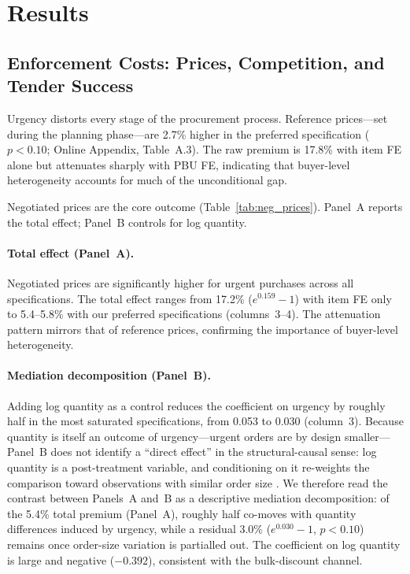 \section{Results}
\label{sec:results}

\subsection{Enforcement Costs: Prices, Competition, and Tender Success}
\label{sec:main_results}

Urgency distorts every stage of the procurement process. Reference prices---set during the planning phase---are 2.7\% higher in the preferred specification ($p < 0.10$; Online Appendix, Table~A.3). The raw premium is 17.8\% with item FE alone but attenuates sharply with PBU FE, indicating that buyer-level heterogeneity accounts for much of the unconditional gap.

Negotiated prices are the core outcome (Table~\ref{tab:neg_prices}). Panel~A reports the total effect; Panel~B controls for log quantity.



\paragraph{Total effect (Panel~A).}
Negotiated prices are significantly higher for urgent purchases across all specifications. The total effect ranges from 17.2\% ($e^{0.159}-1$) with item FE only to 5.4--5.8\% with our preferred specifications (columns~3--4). The attenuation pattern mirrors that of reference prices, confirming the importance of buyer-level heterogeneity.

\paragraph{Mediation decomposition (Panel~B).}
Adding log quantity as a control reduces the coefficient on urgency by roughly half in the most saturated specifications, from 0.053 to 0.030 (column~3).\label{fn:mediation-anchor} Because quantity is itself an outcome of urgency---urgent orders are by design smaller---Panel~B does not identify a ``direct effect'' in the structural-causal sense: log quantity is a post-treatment variable, and conditioning on it re-weights the comparison toward observations with similar order size \citep{acharya2016explaining}. We therefore read the contrast between Panels~A and~B as a descriptive mediation decomposition: of the 5.4\% total premium (Panel~A), roughly half co-moves with quantity differences induced by urgency, while a residual 3.0\% ($e^{0.030}-1$, $p < 0.10$) remains once order-size variation is partialled out. The coefficient on log quantity is large and negative ($-0.392$), consistent with the bulk-discount channel.

